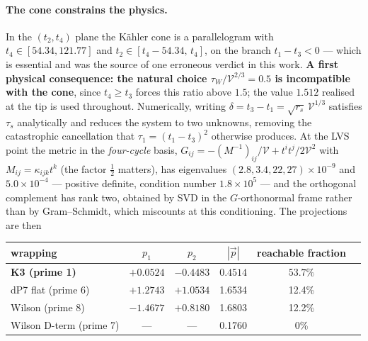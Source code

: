 \paragraph{The cone constrains the physics.} In the $(t_2,t_4)$ plane the K\"ahler cone is a parallelogram with $t_4\in[54.34,121.77]$ and $t_2\in[t_4-54.34,\,t_4]$, on the branch $t_1-t_3<0$ --- which is essential and was the source of one erroneous verdict in this work. \textbf{A first physical consequence: the natural choice $\tau_W/\mathcal V^{2/3}=0.5$ is incompatible with the cone}, since $t_4\geq t_3$ forces this ratio above $1.5$; the value $1.512$ realised at the tip is used throughout. Numerically, writing $\delta=t_3-t_1=\sqrt{r_s}\,\mathcal V^{1/3}$ satisfies $\tau_s$ analytically and reduces the system to two unknowns, removing the catastrophic cancellation that $\tau_1=(t_1-t_3)^2$ otherwise produces. At the LVS point the metric in the \emph{four-cycle} basis, $G_{ij}=-(M^{-1})_{ij}/\mathcal V+t^it^j/2\mathcal V^2$ with $M_{ij}=\kappa_{ijk}t^k$ (the factor $\tfrac12$ matters), has eigenvalues $(2.8,3.4,22,27)\times10^{-9}$ and $5.0\times10^{-4}$ --- positive definite, condition number $1.8\times10^5$ --- and the orthogonal complement has rank two, obtained by SVD in the $G$-orthonormal frame rather than by Gram--Schmidt, which miscounts at this conditioning. The projections are then
\begin{center}\small
\begin{tabular}{lccccc}\toprule
wrapping & $p_1$ & $p_2$ & $|\vec p|$ & reachable fraction\\\midrule
\textbf{K3 (prime 1)}&$+0.0524$&$-0.4483$&$\mathbf{0.4514}$&$\mathbf{53.7\%}$\\
dP7 flat (prime 6)&$+1.2743$&$+1.0534$&1.6534&12.4\%\\
Wilson (prime 8)&$-1.4677$&$+0.8180$&1.6803&12.2\%\\
Wilson D-term (prime 7)&---&---&0.1760&0\%\\\bottomrule
\end{tabular}
\end{center}
